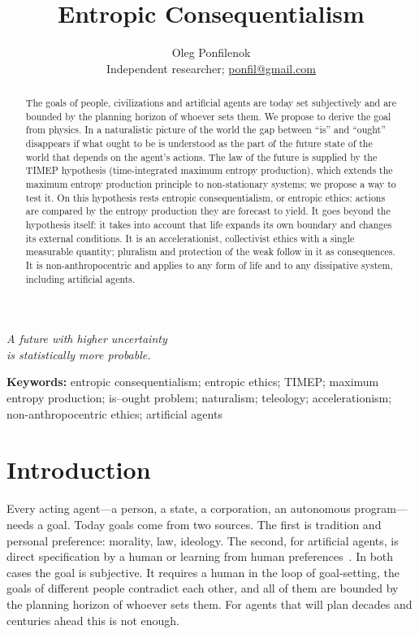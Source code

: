 \documentclass[11pt,a4paper]{article}
\title{\textbf{Entropic Consequentialism}}
\author{%
  Oleg Ponfilenok\\[0.35em]%
  {\normalsize Independent researcher; \href{mailto:ponfil@gmail.com}{ponfil@gmail.com}}%
}
\date{}
\begin{document}
\maketitle

\begin{flushright}
\emph{A future with higher uncertainty\\ is statistically more probable.}
\end{flushright}
\vspace{0.5em}

\begin{abstract}
The goals of people, civilizations and artificial agents are today set subjectively and are bounded by the planning horizon of whoever sets them. We propose to derive the goal from physics. In a naturalistic picture of the world the gap between ``is'' and ``ought'' disappears if what ought to be is understood as the part of the future state of the world that depends on the agent's actions. The law of the future is supplied by the TIMEP hypothesis (time-integrated maximum entropy production), which extends the maximum entropy production principle to non-stationary systems; we propose a way to test it. On this hypothesis rests entropic consequentialism, or entropic ethics: actions are compared by the entropy production they are forecast to yield. It goes beyond the hypothesis itself: it takes into account that life expands its own boundary and changes its external conditions. It is an accelerationist, collectivist ethics with a single measurable quantity; pluralism and protection of the weak follow in it as consequences. It is non-anthropocentric and applies to any form of life and to any dissipative system, including artificial agents.
\end{abstract}

\noindent\textbf{Keywords:} entropic consequentialism; entropic ethics; TIMEP; maximum entropy production; is--ought problem; naturalism; teleology; accelerationism; non-anthropocentric ethics; artificial agents

\vspace{1em}

\section{Introduction}\label{sec:intro}

Every acting agent---a person, a state, a corporation, an autonomous program---needs a goal. Today goals come from two sources. The first is tradition and personal preference: morality, law, ideology. The second, for artificial agents, is direct specification by a human or learning from human preferences~\cite{russell2019,hadfield2016}. In both cases the goal is subjective. It requires a human in the loop of goal-setting, the goals of different people contradict each other, and all of them are bounded by the planning horizon of whoever sets them. For agents that will plan decades and centuries ahead this is not enough.
\end{document}
